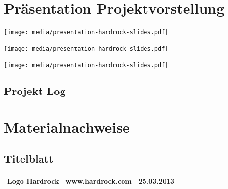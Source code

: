 \documentclass[ngerman,a4paper,12pt]{scrreprt}
\begin{document}
\appendix
\chapter{Präsentation Projektvorstellung}
\begin{center}
	\texttt{[image: media/presentation-hardrock-slides.pdf]}
\end{center}
\begin{center}
	\texttt{[image: media/presentation-hardrock-slides.pdf]}
\end{center}
\begin{center}
	\texttt{[image: media/presentation-hardrock-slides.pdf]}
\end{center}
%

\listoffigures

\begin{landscape}
\chapter{Projekt Log}

\end{landscape}

\chapter{Materialnachweise}
\section{Titelblatt}
\begin{tabularx}{\textwidth}{|Xlr|}
		\hline
		Logo Hardrock & www.hardrock.com & 25.03.2013 \\
		\hline
\end{tabularx}
\end{document}
